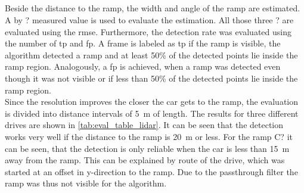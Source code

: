 \subsection{}
Beside the distance to the ramp, the width and angle of the ramp are estimated.
A by ? measured value is used to evaluate the estimation.
All those three ? are evaluated using the \gls{rmse}.
Furthermore, the detection rate was evaluated using the number of \gls{tp} and \gls{fp}.
A frame is labeled as \gls{tp} if the ramp is visible, the algorithm detected a ramp and at least 50\% of the detected points lie inside the ramp region.
Analogously, a \gls{fp} is achieved, when a ramp was detected even though it was not visible or if less than 50\% of the detected points lie inside the ramp region.\\
Since the resolution improves the closer the car gets to the ramp, the evaluation is divided into distance intervals of \SI{5}{\metre} of length.
The results for three different drives are shown in \cref{tab:eval_table_lidar}.
It can be seen that the detection works very well if the distance to the ramp is \SI{20}{\metre} or less.
For the ramp C? it can be seen, that the detection is only reliable when the car is less than \SI{15}{\metre} away from the ramp.
This can be explained by route of the drive, which was started at an offset in y-direction to the ramp.
Due to the passthrough filter the ramp was thus not visible for the algorithm.\\
